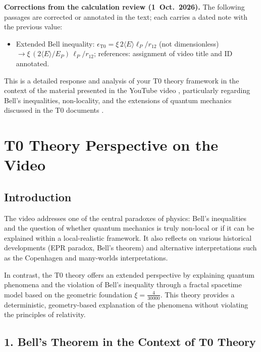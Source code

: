 \begin{tcolorbox}[colback=red!3!white,colframe=red!50!black,boxrule=0.8pt,title={Correction notes},fonttitle=\bfseries]
\textbf{Corrections from the calculation review (1~Oct.~2026).} The following passages are corrected or annotated in the text; each carries a dated note with the previous value:
\begin{itemize}
\item Extended Bell inequality: $\epsilon_{\mathrm{T0}} = \xi\,2\langle E\rangle\ell_P/r_{12}$ (not dimensionless) $\to \xi\,(2\langle E\rangle/E_P)\,\ell_P/r_{12}$; references: assignment of video title and ID annotated.
\end{itemize}
\end{tcolorbox}

This is a detailed response and analysis of your T0 theory framework in the context of the material presented in the YouTube video \cite{VideoBell2024}, particularly regarding Bell's inequalities, non-locality, and the extensions of quantum mechanics discussed in the T0 documents \cite{Bell_En, DynMassePhotonenNichtlokalEn, NoGoEn, 023_Bell_En_ch, 131_scheinbar_instantan_En}.
	
	\section*{T0 Theory Perspective on the Video}
	
	\subsection*{Introduction}
	
	The video \cite{VideoBell2024} addresses one of the central paradoxes of physics: Bell's inequalities and the question of whether quantum mechanics is truly non-local or if it can be explained within a local-realistic framework. It also reflects on various historical developments (EPR paradox, Bell's theorem) and alternative interpretations such as the Copenhagen and many-worlds interpretations.
	
	In contrast, the T0 theory offers an extended perspective by explaining quantum phenomena and the violation of Bell's inequality through a fractal spacetime model based on the geometric foundation $\xi = \frac{4}{30000}$. This theory provides a deterministic, geometry-based explanation of the phenomena without violating the principles of relativity.
	
	\subsection*{1. Bell's Theorem in the Context of T0 Theory}
	
